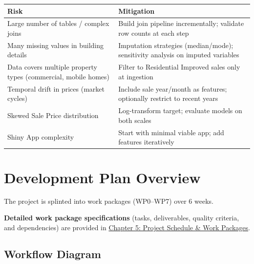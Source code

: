 \documentclass[
  english,
  letterpaper,
  DIV=11,
  numbers=noendperiod]{scrreprt}
\newcounter{none} %
\begin{document}
{\def\LTcaptype{none} %
\begin{longtable}[]{@{}
  >{\raggedright\arraybackslash}p{}
  >{\raggedright\arraybackslash}p{}@{}}
\toprule\noalign{}
\begin{minipage}[b]{\linewidth}\raggedright
Risk
\end{minipage} & \begin{minipage}[b]{\linewidth}\raggedright
Mitigation
\end{minipage} \\
\midrule\noalign{}
\endhead
\bottomrule\noalign{}
\endlastfoot
Large number of tables / complex joins & Build join pipeline
incrementally; validate row counts at each step \\
Many missing values in building details & Imputation strategies
(median/mode); sensitivity analysis on imputed variables \\
Data covers multiple property types (commercial, mobile homes) & Filter
to Residential Improved sales only at ingestion \\
Temporal drift in prices (market cycles) & Include sale year/month as
features; optionally restrict to recent years \\
Skewed Sale Price distribution & Log-transform target; evaluate models
on both scales \\
Shiny App complexity & Start with minimal viable app; add features
iteratively \\
\end{longtable}
}


\chapter{Development Plan Overview}\label{development-plan-overview}

The project is splinted into work packages (WP0--WP7) over 6 weeks.

\textbf{Detailed work package specifications} (tasks, deliverables,
quality criteria, and dependencies) are provided in
\href{05-project-schedule-and-workpackages.qmd}{Chapter 5: Project
Schedule \& Work Packages}.

\section{Workflow Diagram}\label{workflow-diagram}
\end{document}
